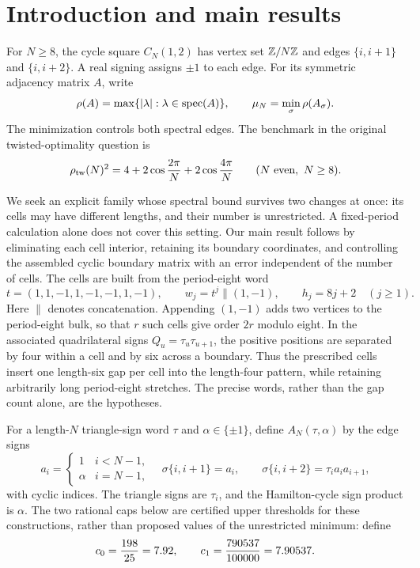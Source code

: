 \section{Introduction and main results}

For $N\ge8$, the cycle square $C_N(1,2)$ has vertex set $\mathbb Z/N\mathbb Z$ and
edges $\{i,i+1\}$ and $\{i,i+2\}$. A real signing assigns $\pm1$ to each
edge. For its symmetric adjacency matrix $A$, write
\[
 \rho(A)=\max\{|\lambda|:\lambda\in\operatorname{spec}(A)\},
 \qquad \mu_N=\min_\sigma\rho(A_\sigma).
\]
The minimization controls both spectral edges. The benchmark in the
original twisted-optimality question \cite{Suvagiya2026old} is
\begin{equation}
 \rho_{\mathrm{tw}}(N)^2=4+2\cos\frac{2\pi}{N}+2\cos\frac{4\pi}{N}
 \qquad(N\text{ even},\ N\ge8).
 \label{eq:twisted}
\end{equation}

We seek an explicit family whose spectral bound survives two changes at
once: its cells may have different lengths, and their number is unrestricted.
A fixed-period calculation alone does not cover this setting. Our main
result follows by eliminating each cell interior, retaining its boundary
coordinates, and controlling the assembled cyclic boundary matrix with an
error independent of the number of cells. The cells are built from the
period-eight word
\begin{equation}
 t=(1,1,-1,1,-1,-1,1,-1),\qquad
 w_j=t^j\mathbin{\|}(1,-1),\qquad h_j=8j+2\quad(j\ge1).
 \label{eq:word}
\end{equation}
Here $\|$ denotes concatenation. Appending $(1,-1)$ adds two vertices to
the period-eight bulk, so that $r$ such cells give order $2r$ modulo eight.
In the associated quadrilateral signs $Q_u=\tau_u\tau_{u+1}$, the positive
positions are separated by four within a cell and by six across a boundary.
Thus the prescribed cells insert one length-six gap per cell into the
length-four pattern, while retaining arbitrarily long period-eight stretches.
The precise words, rather than the gap count alone, are the hypotheses.

For a length-$N$ triangle-sign word
$\tau$ and $\alpha\in\{\pm1\}$, define $A_N(\tau,\alpha)$ by the edge signs
\begin{equation}
 a_i=\begin{cases}1&i<N-1,\\\alpha&i=N-1,\end{cases}
 \quad
 \sigma\{i,i+1\}=a_i,\qquad
 \sigma\{i,i+2\}=\tau_i a_i a_{i+1},
 \label{eq:gauge-definition}
\end{equation}
with cyclic indices. The triangle signs are $\tau_i$, and the
Hamilton-cycle sign product is $\alpha$.
The two rational caps below are certified upper thresholds for these
constructions, rather than proposed values of the unrestricted minimum:
define
\[
 c_0=\frac{198}{25}=7.92,\qquad
 c_1=\frac{790537}{100000}=7.90537.
\]

